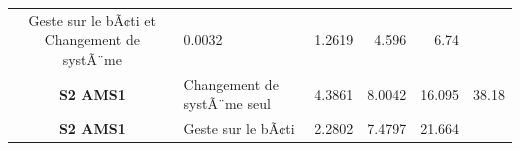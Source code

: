 \documentclass[]{article}
\begin{document}
\begin{longtable}[]{@{}clrrrr@{}}
\begin{minipage}[t]{0.29\columnwidth}
Geste sur le bÃ¢ti et Changement de systÃ¨me\strut
\end{minipage} & \begin{minipage}[t]{0.09\columnwidth}\raggedleft\strut
0.0032\strut
\end{minipage} & \begin{minipage}[t]{0.09\columnwidth}\raggedleft\strut
1.2619\strut
\end{minipage} & \begin{minipage}[t]{0.09\columnwidth}\raggedleft\strut
4.596\strut
\end{minipage} & \begin{minipage}[t]{0.09\columnwidth}\raggedleft\strut
6.74\strut
\end{minipage}\tabularnewline
\begin{minipage}[t]{0.17\columnwidth}\centering\strut
\textbf{S2 AMS1}\strut
\end{minipage} & \begin{minipage}[t]{0.29\columnwidth}\raggedright\strut
Changement de systÃ¨me seul\strut
\end{minipage} & \begin{minipage}[t]{0.09\columnwidth}\raggedleft\strut
4.3861\strut
\end{minipage} & \begin{minipage}[t]{0.09\columnwidth}\raggedleft\strut
8.0042\strut
\end{minipage} & \begin{minipage}[t]{0.09\columnwidth}\raggedleft\strut
16.095\strut
\end{minipage} & \begin{minipage}[t]{0.09\columnwidth}\raggedleft\strut
38.18\strut
\end{minipage}\tabularnewline
\begin{minipage}[t]{0.17\columnwidth}\centering\strut
\textbf{S2 AMS1}\strut
\end{minipage} & \begin{minipage}[t]{0.29\columnwidth}\raggedright\strut
Geste sur le bÃ¢ti\strut
\end{minipage} & \begin{minipage}[t]{0.09\columnwidth}\raggedleft\strut
2.2802\strut
\end{minipage} & \begin{minipage}[t]{0.09\columnwidth}\raggedleft\strut
7.4797\strut
\end{minipage} & \begin{minipage}[t]{0.09\columnwidth}\raggedleft\strut
21.664\strut

\end{minipage}
\end{longtable}
\end{document}
